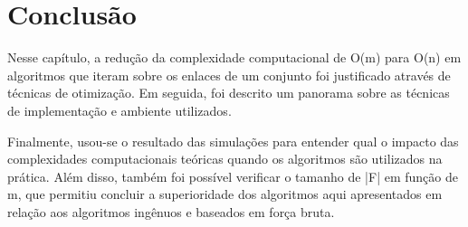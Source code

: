 \section{Conclusão}

Nesse capítulo, a redução da complexidade computacional de O(m) para O(n) em algoritmos que iteram sobre os enlaces de um conjunto foi justificado através de técnicas de otimização. Em seguida, foi descrito um panorama sobre as técnicas de implementação e ambiente utilizados. 

Finalmente, usou-se o resultado das simulações para entender qual o impacto das complexidades computacionais teóricas quando os algoritmos são utilizados na prática. Além disso, também foi possível verificar o tamanho de |F| em função de m, que permitiu concluir a superioridade dos algoritmos aqui apresentados em relação aos algoritmos ingênuos e baseados em força bruta.
